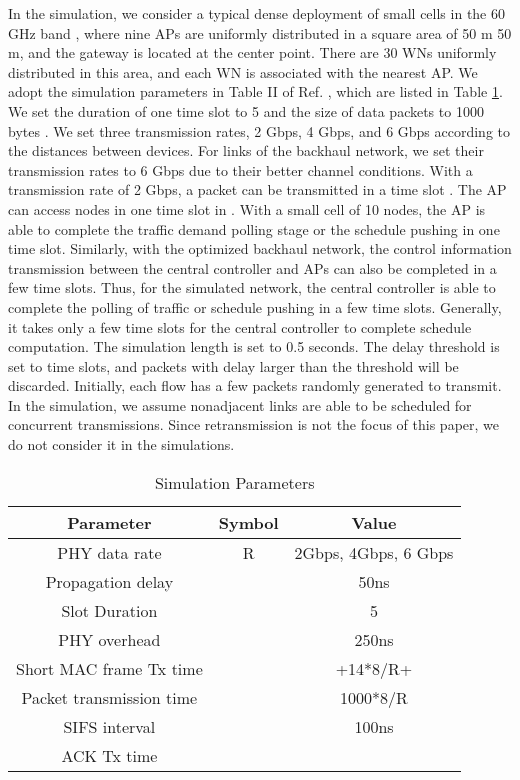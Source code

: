 \documentclass[journal]{IEEEtran}
\begin{document}
In the simulation, we consider a typical dense deployment of small cells in the 60 GHz band
\cite{dense cells}, where nine APs are uniformly distributed in a square area of 50 m 
50 m, and the gateway is located at the center point. There are 30 WNs uniformly distributed in this
area, and each WN is associated with the nearest AP. We adopt the simulation parameters in Table II
of Ref. \cite{MRDMAC}, which are listed in Table \ref{tab:simulation_parameter}. We set the
duration of one time slot to 5  and the size of data packets to 1000 bytes \cite{mao}. We set three
transmission rates, 2 Gbps, 4 Gbps, and 6 Gbps according to the distances between devices. For
links of the backhaul network, we set their transmission rates to 6 Gbps due to their better
channel conditions. With a transmission rate of 2 Gbps, a packet can be transmitted in a time slot
\cite{mao}. The AP can access  nodes in one time slot in \cite{mao}. With a small cell of 10 nodes,
the AP is able to complete the traffic demand polling stage or the schedule
pushing in one time slot. Similarly, with the optimized backhaul network, the control information transmission between the central controller and APs can also be completed in a few time slots. Thus, for the simulated network, the central controller is able to complete the polling of
traffic or schedule pushing in a few time slots. Generally, it takes only a few time slots for the
central controller to complete schedule computation. The simulation length is set to 0.5 seconds.
The delay threshold is set to  time slots, and packets with delay larger than the threshold
will be discarded. Initially, each flow has a few packets randomly generated to transmit. In the simulation, we assume nonadjacent links are able to be scheduled for concurrent transmissions. Since retransmission is not the focus of this paper, we do not consider it in the simulations.

\begin{table}
\begin{center}
\caption{Simulation Parameters}
\def \temptablewidth {0.9\textwidth}
\begin{tabular}{ccc}
\hline
\textbf{Parameter}&\textbf{Symbol}&\textbf{Value}\\
\hline
PHY data rate & R & 2Gbps, 4Gbps, 6 Gbps \\
Propagation delay&& 50ns\\
Slot Duration &  & 5 \\
PHY overhead&  & 250ns\\
Short MAC frame Tx time& & +14*8/R+\\
Packet transmission time&& 1000*8/R\\
SIFS interval&& 100ns\\
ACK Tx time&&\\
\hline
\end{tabular}
\label{tab:simulation_parameter}
\end{center}
\end{table}
\end{document}

